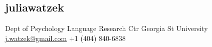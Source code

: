 \documentclass[]{friggeri-cv}
\begin{document}

\begin{aside}
  \section{{\normalfont julia}watzek}
    Dept of Psychology
    Language Research Ctr
    Georgia St University
    ~
    \href{mailto:j.watzek@gmail.com}{j.watzek@gmail.com}
    +1 (404) 840-6838
\end{aside}






\end{document}

